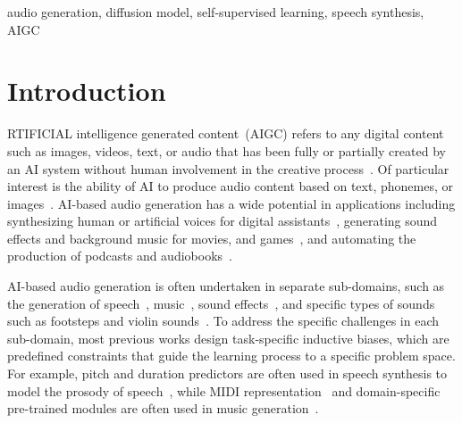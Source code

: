 \documentclass[lettersize,journal]{IEEEtran}
\begin{document}
\begin{IEEEkeywords}
audio generation, diffusion model, self-supervised learning, speech synthesis, AIGC
\end{IEEEkeywords}

\section{Introduction}

RTIFICIAL intelligence generated content~(AIGC) refers to any digital content such as images, videos, text, or audio that has been fully or partially created by an AI system without human involvement in the creative process~\cite{cao2023comprehensive}. Of particular interest is the ability of AI to produce audio content based on text, phonemes, or images~\cite{tan2022naturalspeech, kreuk2022audiogen, liu2023audioldm}. AI-based audio generation has a wide potential in applications including synthesizing human or artificial voices for digital assistants~\cite{zhang2023speechgpt}, generating sound effects and background music for movies, and games~\cite{riffusion}, and automating the production of podcasts and audiobooks~\cite{liu2023wavjourney}. 

AI-based audio generation is often undertaken in separate sub-domains, such as the generation of speech~\cite{tan2022naturalspeech}, music~\cite{agostinelli2023musiclm}, sound effects~\cite{liu2023audioldm}, and specific types of sounds such as footsteps and violin sounds~\cite{bresin2010expressive,engel2020ddsp}. To address the specific challenges in each sub-domain, most previous works design task-specific inductive biases, which are predefined constraints that guide the learning process to a specific problem space.
For example, pitch and duration predictors are often used in speech synthesis to model the prosody of speech~\cite{Fastspeech2, tan2022naturalspeech}, while MIDI representation~\cite{herremans2016morpheus} and domain-specific pre-trained modules are often used in music generation~\cite{lam2023efficient-melody, agostinelli2023musiclm}.
\end{document}
